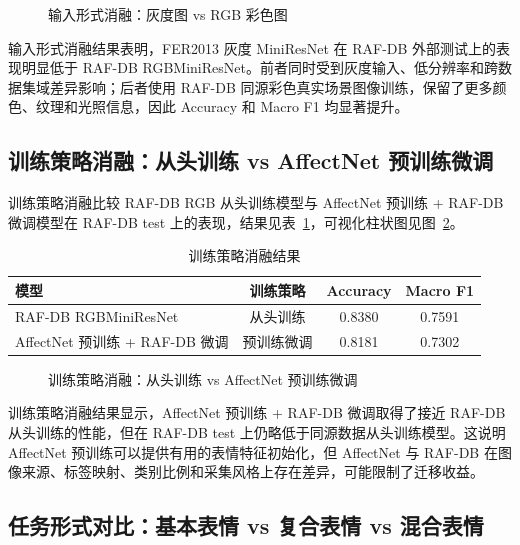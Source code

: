 \documentclass[UTF8,a4paper,12pt]{ctexart}
\newcommand{\figplaceholder}[1]{%
  \begin{center}
    \fbox{\parbox{0.78\textwidth}{\centering #1}}
  \end{center}
}
\begin{document}
\begin{figure}[H]
  \centering
  \figplaceholder{\rule{0pt}{1.2em}}
  \caption{输入形式消融：灰度图 vs RGB 彩色图}
  \label{fig:input_ablation}
\end{figure}

输入形式消融结果表明，FER2013 灰度 MiniResNet 在 RAF-DB 外部测试上的表现明显低于 RAF-DB RGBMiniResNet。前者同时受到灰度输入、低分辨率和跨数据集域差异影响；后者使用 RAF-DB 同源彩色真实场景图像训练，保留了更多颜色、纹理和光照信息，因此 Accuracy 和 Macro F1 均显著提升。

\subsection{训练策略消融：从头训练 vs AffectNet 预训练微调}

训练策略消融比较 RAF-DB RGB 从头训练模型与 AffectNet 预训练 + RAF-DB 微调模型在 RAF-DB test 上的表现，结果见表~\ref{tab:training_strategy_ablation}，可视化柱状图见图~\ref{fig:training_strategy_ablation}。

\begin{table}[H]
  \centering
  \caption{训练策略消融结果}
  \label{tab:training_strategy_ablation}
  \begin{tabular}{lccc}
    \toprule
    模型 & 训练策略 & Accuracy & Macro F1 \\
    \midrule
    RAF-DB RGBMiniResNet & 从头训练 & 0.8380 & 0.7591 \\
    AffectNet 预训练 + RAF-DB 微调 & 预训练微调 & 0.8181 & 0.7302 \\
    \bottomrule
  \end{tabular}
\end{table}

\begin{figure}[H]
  \centering
  \figplaceholder{\rule{0pt}{1.2em}}
  \caption{训练策略消融：从头训练 vs AffectNet 预训练微调}
  \label{fig:training_strategy_ablation}
\end{figure}

训练策略消融结果显示，AffectNet 预训练 + RAF-DB 微调取得了接近 RAF-DB 从头训练的性能，但在 RAF-DB test 上仍略低于同源数据从头训练模型。这说明 AffectNet 预训练可以提供有用的表情特征初始化，但 AffectNet 与 RAF-DB 在图像来源、标签映射、类别比例和采集风格上存在差异，可能限制了迁移收益。

\subsection{任务形式对比：基本表情 vs 复合表情 vs 混合表情}
\end{document}
